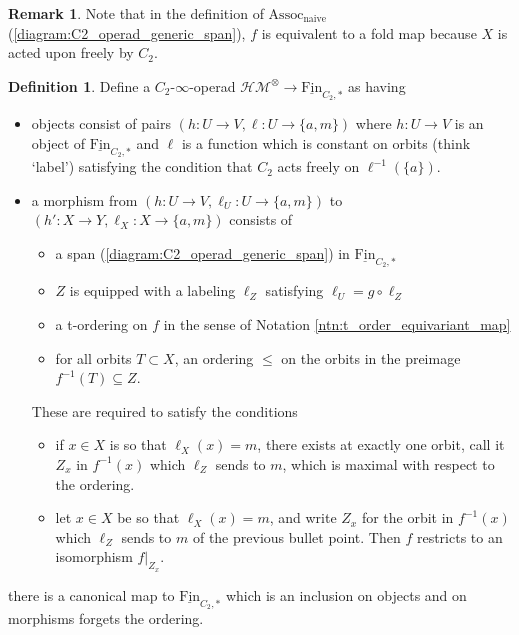 \documentclass{article}
\theoremstyle{definition}
\newtheorem{definition}[equation]{Definition}
\newtheorem{remark}[equation]{Remark}
\begin{document}
\begin{remark}
    Note that in the definition of $ \mathrm{Assoc}_{\mathrm{naive}} $ (\ref{diagram:C2_operad_generic_span}), $ f $ is equivalent to a fold map because $ X $ is acted upon freely by $ C_2 $. 
\end{remark}
\begin{definition}\label{defn:hermitian_mod_param_operad}
    Define a $ C_2 $-$ \infty $-operad $ \mathcal{HM}^\otimes \to \underline{\mathrm{Fin}}_{C_2, *} $ as having 
    \begin{itemize}
        \item objects consist of pairs $ (h : U \to V, \ell \colon U \to \{a, m\}) $ where $ h: U \to V $ is an object of $ \underline{\mathrm{Fin}}_{C_2, *} $ and $ \ell $ is a function which is constant on orbits (think `label') satisfying the condition that $ C_2 $ acts freely on $ \ell^{-1}(\{a\}) $. 
        \item a morphism from $ (h : U \to V, \ell_U \colon U \to \{a, m\}) $ to $ (h' : X \to Y, \ell_X \colon X \to \{a, m\}) $ consists of 
        \begin{itemize}
            \item a span (\ref{diagram:C2_operad_generic_span}) in $ \underline{\mathrm{Fin}}_{C_2, *} $
            \item $ Z $ is equipped with a labeling $ \ell_Z $ satisfying $ \ell_U = g \circ \ell_Z $ 
            \item a t-ordering on $ f $ in the sense of Notation \ref{ntn:t_order_equivariant_map}  
            \item for all orbits $ T \subset X $, an ordering $ \leq $ on the orbits in the preimage $ f^{-1}(T) \subseteq Z $. 
        \end{itemize} 
        These are required to satisfy the conditions 
        \begin{itemize}
            \item if $ x \in X $ is so that $ \ell_X(x) = m $, there exists at exactly one orbit, call it $ Z_x $ in $ f^{-1}(x) $ which $ \ell_Z $ sends to $ m $, which is maximal with respect to the ordering.  
            \item let $ x \in X $ be so that $ \ell_X(x) = m $, and write $ Z_x $ for the orbit in $ f^{-1}(x) $ which $ \ell_Z $ sends to $ m $ of the previous bullet point. Then $ f $ restricts to an isomorphism $ f|_{Z_x} $. %
        \end{itemize}
    \end{itemize}
    there is a canonical map to $ \underline{\mathrm{Fin}}_{C_2, *} $ which is an inclusion on objects and on morphisms forgets the ordering. 
\end{definition}
\end{document}
